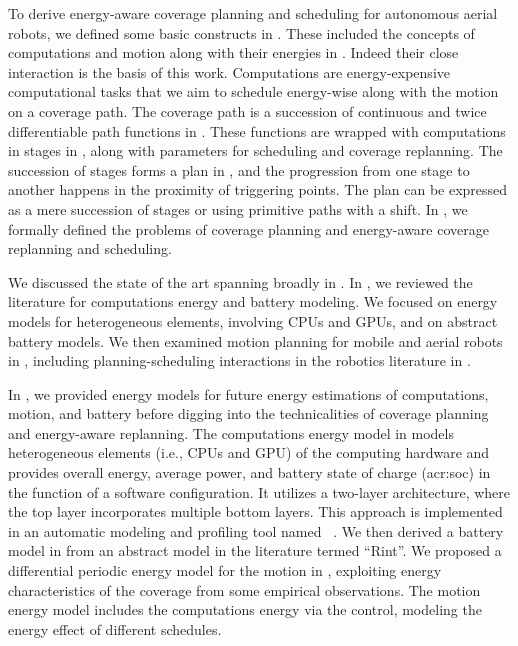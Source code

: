 To derive energy-aware coverage planning and scheduling for autonomous aerial robots, we defined some basic constructs in . These included the concepts of computations and motion along with their energies in . Indeed their close interaction is the basis of this work. Computations are energy-expensive computational tasks that we aim to schedule energy-wise along with the motion on a coverage path. The coverage path is a succession of continuous and twice differentiable path functions in . These functions are wrapped with computations in stages in , along with parameters for scheduling and coverage replanning. The succession of stages forms a plan in , and the progression from one stage to another happens in the proximity of triggering points. The plan can be expressed as a mere succession of stages or using primitive paths with a shift. In , we formally defined the problems of coverage planning and energy-aware coverage replanning and scheduling.

We discussed the state of the art spanning broadly in . In , we reviewed the literature for computations energy and battery modeling. We focused on energy models for heterogeneous elements, involving CPUs and GPUs, and on abstract battery models. We then examined motion planning for mobile and aerial robots in , including planning-scheduling interactions in the robotics literature in .

In , we provided energy models for future energy estimations of computations, motion, and battery before digging into the technicalities of coverage planning and energy-aware replanning. The computations energy model in  models heterogeneous elements (i.e., CPUs and GPU) of the computing hardware and provides overall energy, average power, and battery state of charge (\Gls{acr:soc}) in the function of a software configuration. It utilizes a two-layer architecture, where the top layer incorporates multiple bottom layers. This approach is implemented in an automatic modeling and profiling tool named \powprof~\citep{seewald2019coarse,powprofiler}. We then derived a battery model in  from an abstract model in the literature termed ``Rint''. We proposed a differential periodic energy model for the motion in , exploiting energy characteristics of the coverage from some empirical observations. The motion energy model includes the computations energy via the control, modeling the energy effect of different schedules.

